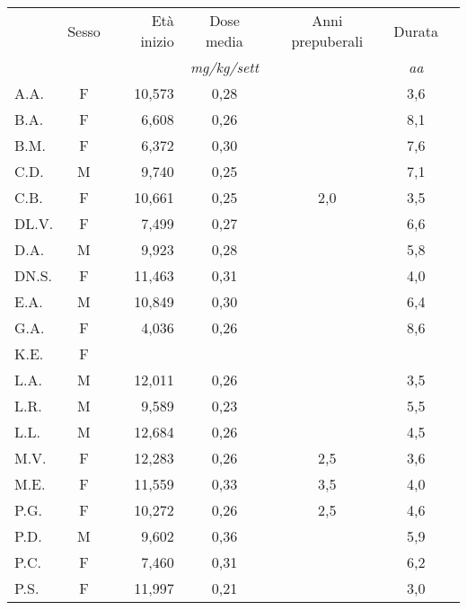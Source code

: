 \begin{table}[!h]
\begin{center}
\begin{tabular}{lcrcccl}
\toprule
 &      Sesso &   Età inizio  & Dose media 	& Anni prepuberali & Durata \\
 &     &				  	& \emph{mg/kg/sett}	& & \emph{aa} \\
\midrule                                  	
A.A.	& F & 10,573  	      &  0,28     	&                  & 3,6  \\
B.A.	& F & 6,608   	      &  0,26     	&                  & 8,1  \\
B.M.	& F & 6,372   	      &  0,30     	&                  & 7,6  \\
C.D.	& M & 9,740   	      &  0,25     	&                  & 7,1  \\
C.B.	& F & 10,661  	      &  0,25     	& 2,0              & 3,5  \\
DL.V.	& F & 7,499   	      &  0,27     	&                  & 6,6  \\
D.A.	& M & 9,923   	      &  0,28     	&                  & 5,8  \\
DN.S.	& F & 11,463  	      &  0,31     	&                  & 4,0  \\
E.A.	& M & 10,849  	      &  0,30     	&                  & 6,4  \\
G.A.	& F & 4,036   	      &  0,26     	&                  & 8,6  \\
K.E.	& F &         	      &           	&                  &      \\
L.A.	& M & 12,011  	      &  0,26     	&                  & 3,5  \\
L.R.	& M & 9,589   	      &  0,23     	&                  & 5,5  \\
L.L.	& M & 12,684  	      &  0,26     	&                  & 4,5  \\
M.V.	& F & 12,283  	      &  0,26     	& 2,5              & 3,6  \\
M.E.	& F & 11,559  	      &  0,33     	& 3,5              & 4,0  \\
P.G.	& F & 10,272  	      &  0,26     	& 2,5              & 4,6  \\
P.D.	& M & 9,602   	      &  0,36     	&                  & 5,9  \\
P.C.	& F & 7,460   	      &  0,31     	&                  & 6,2  \\
P.S.	& F & 11,997  	      &  0,21     	&                  & 3,0  \\

\end{tabular}
\end{center}
\end{table}
